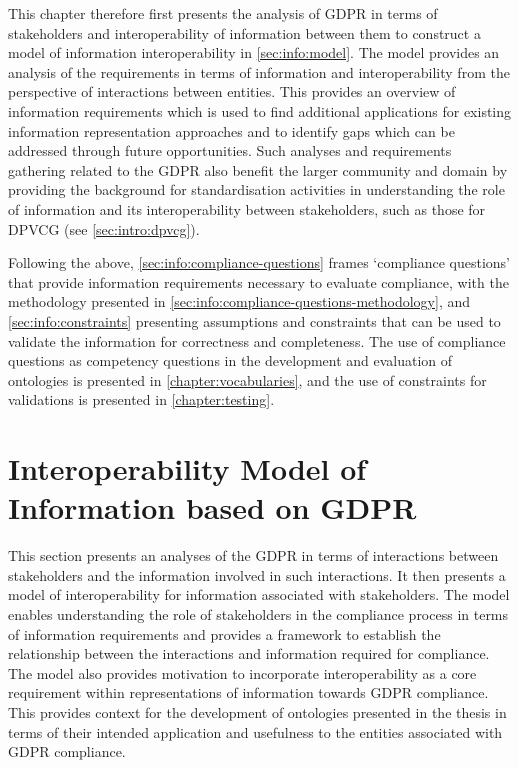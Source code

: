 This chapter therefore first presents the analysis of GDPR in terms of stakeholders and interoperability of information between them to construct a model of information interoperability in \autoref{sec:info:model}.
The model provides an analysis of the requirements in terms of information and interoperability from the perspective of interactions between entities.
This provides an overview of information requirements which is used to find additional applications for existing information representation approaches and to identify gaps which can be addressed through future opportunities.
Such analyses and requirements gathering related to the GDPR also benefit the larger community and domain by providing the background for standardisation activities in understanding the role of information and its interoperability between stakeholders, such as those for DPVCG (see \autoref{sec:intro:dpvcg}).

Following the above, \autoref{sec:info:compliance-questions} frames `compliance questions' that provide information requirements necessary to evaluate compliance, with the methodology presented in \autoref{sec:info:compliance-questions-methodology}, and \autoref{sec:info:constraints} presenting assumptions and constraints that can be used to validate the information for correctness and completeness.
The use of compliance questions as competency questions in the development and evaluation of ontologies is presented in \autoref{chapter:vocabularies}, and the use of constraints for validations is presented in \autoref{chapter:testing}.

\color{blue}
\section{Interoperability Model of Information based on GDPR}\label{sec:info:model}
This section presents an analyses of the GDPR in terms of interactions between stakeholders and the information involved in such interactions. It then presents a model of interoperability for information associated with stakeholders. The model enables understanding the role of stakeholders in the compliance process in terms of information requirements and provides a framework to establish the relationship between the interactions and information required for compliance. 
The model also provides motivation to incorporate interoperability as a core requirement within representations of information towards GDPR compliance.
This provides context for the development of ontologies presented in the thesis in terms of their intended application and usefulness to the entities associated with GDPR compliance.


